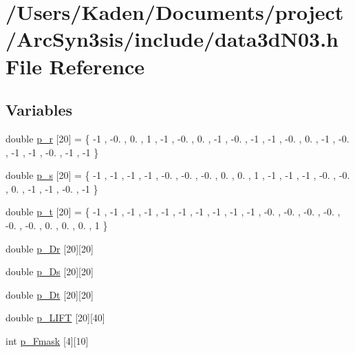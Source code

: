 \hypertarget{a00485}{}\section{/\+Users/\+Kaden/\+Documents/project/\+Arc\+Syn3sis/include/data3d\+N03.h File Reference}
\label{a00485}
\subsection*{Variables}
\begin{DoxyCompactItemize}
\item 
double \hyperlink{a00485_af78edd19bf59dc74c169fb10b5074e12}{p\+\_\+r} \mbox{[}20\mbox{]} = \{ -\/1 , -\/0. , 0. , 1 , -\/1 , -\/0. , 0. , -\/1 , -\/0. , -\/1 , -\/1 , -\/0. , 0. , -\/1 , -\/0. , -\/1 , -\/1 , -\/0. , -\/1 , -\/1 \}
\item 
double \hyperlink{a00485_a4b9bf5cb0bc20ec8f8961a7816ae8f35}{p\+\_\+s} \mbox{[}20\mbox{]} = \{ -\/1 , -\/1 , -\/1 , -\/1 , -\/0. , -\/0. , -\/0. , 0. , 0. , 1 , -\/1 , -\/1 , -\/1 , -\/0. , -\/0. , 0. , -\/1 , -\/1 , -\/0. , -\/1 \}
\item 
double \hyperlink{a00485_ad14ef3644106e8361df3d46303238f38}{p\+\_\+t} \mbox{[}20\mbox{]} = \{ -\/1 , -\/1 , -\/1 , -\/1 , -\/1 , -\/1 , -\/1 , -\/1 , -\/1 , -\/1 , -\/0. , -\/0. , -\/0. , -\/0. , -\/0. , -\/0. , 0. , 0. , 0. , 1 \}
\item 
double \hyperlink{a00485_abe48389fdb66f1242c1cc212865f9f9d}{p\+\_\+\+Dr} \mbox{[}20\mbox{]}\mbox{[}20\mbox{]}
\item 
double \hyperlink{a00485_a1e47c16b2e6ee717c5562d1d404ad52e}{p\+\_\+\+Ds} \mbox{[}20\mbox{]}\mbox{[}20\mbox{]}
\item 
double \hyperlink{a00485_a2195a031817533392de73a55c8509899}{p\+\_\+\+Dt} \mbox{[}20\mbox{]}\mbox{[}20\mbox{]}
\item 
double \hyperlink{a00485_a9ce8ebb2859cefaaf8643b775272767f}{p\+\_\+\+L\+I\+FT} \mbox{[}20\mbox{]}\mbox{[}40\mbox{]}
\item 
int \hyperlink{a00485_a016245a10ef947f0ff48b788cbf58785}{p\+\_\+\+Fmask} \mbox{[}4\mbox{]}\mbox{[}10\mbox{]}
\end{DoxyCompactItemize}


